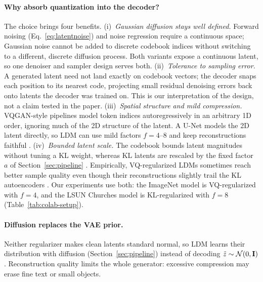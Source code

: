\paragraph{Why absorb quantization into the decoder?} The choice brings
four benefits.
(i)~\emph{Gaussian diffusion stays well defined.} Forward noising
(Eq.~\eqref{eq:latentnoise}) and noise regression require a continuous
space; Gaussian noise cannot be added to discrete codebook indices without
switching to a different, discrete diffusion process. Both variants expose
a continuous latent, so one denoiser and sampler design serves both.
(ii)~\emph{Tolerance to sampling error.} A generated latent need not land
exactly on codebook vectors; the decoder snaps each position to its
nearest code, projecting small residual denoising errors back onto latents
the decoder was trained on. This is our interpretation of the design, not
a claim tested in the paper.
(iii)~\emph{Spatial structure and mild compression.} VQGAN-style pipelines
model token indices autoregressively in an arbitrary 1D order, ignoring
much of the 2D structure of the latent. A U-Net models the 2D latent
directly, so LDM can use mild factors $f=4$--$8$ and keep reconstructions
faithful \cite[Sec.~3.1]{rombach2022ldm}.
(iv)~\emph{Bounded latent scale.} The codebook bounds latent magnitudes
without tuning a KL weight, whereas KL latents are rescaled by the fixed
factor $a$ of Section~\ref{sec:pipeline} \cite{rombach2022ldm}.
Empirically, VQ-regularized LDMs sometimes reach better sample quality even
though their reconstructions slightly trail the KL autoencoders
\cite[Sec.~4, Table~8]{rombach2022ldm}. Our experiments use both: the
ImageNet model is VQ-regularized with $f=4$, and the LSUN Churches model
is KL-regularized with $f=8$ (Table~\ref{tab:colab-setup}).

\paragraph{Diffusion replaces the VAE prior.} Neither regularizer makes
clean latents standard normal, so LDM learns their distribution with
diffusion (Section~\ref{sec:pipeline}) instead of decoding
$\tilde z\sim\mathcal{N}(0,\mathbf{I})$. Reconstruction quality limits the whole
generator: excessive compression may erase fine text or small objects.

